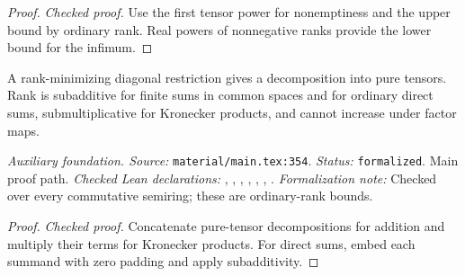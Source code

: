 \begin{proof}
\leanok
{}
\textit{Checked proof.} Use the first tensor power for nonemptiness and the upper bound by ordinary rank. Real powers of nonnegative ranks provide the lower bound for the infimum.
\end{proof}

\renewcommand{\thetheorem}{A25}
\begin{lemma}
\label{aux:rank-operation-bounds}
\leanok
A rank-minimizing diagonal restriction gives a decomposition into pure tensors. Rank is subadditive for finite sums in common spaces and for ordinary direct sums, submultiplicative for Kronecker products, and cannot increase under factor maps.
\end{lemma}

\noindent\textit{Auxiliary foundation. Source:} \texttt{material/main.tex:354}.
\textit{Status:} \texttt{formalized}. Main proof path.
\textit{Checked Lean declarations:} , , , , , , .
\textit{Formalization note:} Checked over every commutative semiring; these are ordinary-rank bounds.

\begin{proof}
\leanok
{}
\textit{Checked proof.} Concatenate pure-tensor decompositions for addition and multiply their terms for Kronecker products. For direct sums, embed each summand with zero padding and apply subadditivity.
\end{proof}

